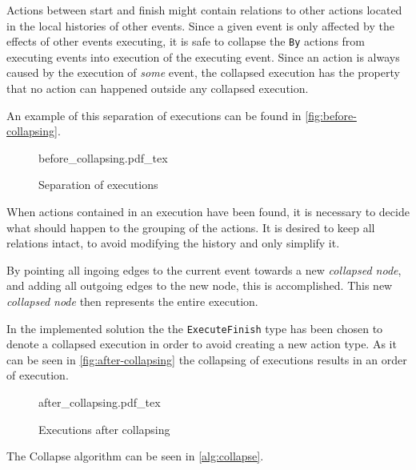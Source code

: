 	Actions between start and finish might contain relations to other actions located in the local histories of other events. Since a given event is only affected by the effects of other events executing, it is safe to collapse the \texttt{By} actions from executing events into execution of the executing event. Since an action is always caused by the execution of \textit{some} event, the collapsed execution has the property that no action can happened outside any collapsed execution.
	
	An example of this separation of executions can be found in \autoref{fig:before-collapsing}.
	
	\begin{figure}
		\centering
		\def\svgwidth{0.42\columnwidth}
		\fontsize{6}{8}\selectfont
		{before_collapsing.pdf_tex}
		\caption{Separation of executions}
		\label{fig:before-collapsing}
	\end{figure}
	
	\newpar When actions contained in an execution have been found, it is necessary to decide what should happen to the grouping of the actions. It is desired to keep all relations intact, to avoid modifying the history and only simplify it. 
	
	By pointing all ingoing edges to the current event towards a new \textit{collapsed node}, and adding all outgoing edges to the new node, this is accomplished. This new \textit{collapsed node} then represents the entire execution. 
	
	In the implemented solution the the \texttt{ExecuteFinish} type has been chosen to denote a collapsed execution in order to avoid creating a new action type. As it can be seen in \autoref{fig:after-collapsing} the collapsing of executions results in an order of execution.
	
	\begin{figure}
		\centering
		\def\svgwidth{0.22\columnwidth}
		\fontsize{6}{8}\selectfont
		{after_collapsing.pdf_tex}
		\caption{Executions after collapsing}
		\label{fig:after-collapsing}
	\end{figure}
	
	The Collapse algorithm can be seen in \autoref{alg:collapse}.
	
